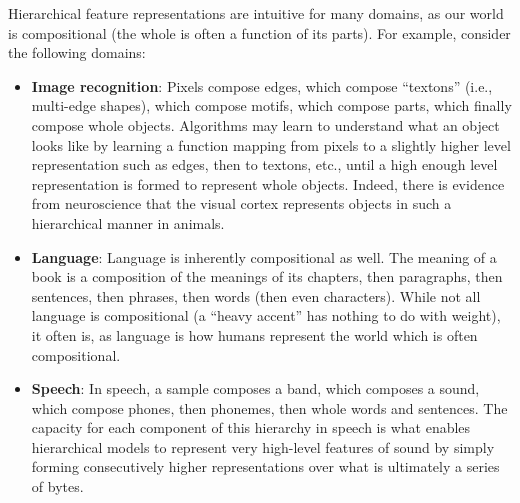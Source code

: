 Hierarchical feature representations are intuitive for many domains, as our world is compositional (the whole is often a function of its parts).
For example, consider the following domains:
\begin{itemize}
    \item \textbf{Image recognition}: Pixels compose edges, which compose ``textons'' (i.e., multi-edge shapes), which compose motifs, which compose parts, which finally compose whole objects.
    Algorithms may learn to understand what an object looks like by learning a function mapping from pixels to a slightly higher level representation such as edges, then to textons, etc., until a high enough level representation is formed to represent whole objects.
    Indeed, there is evidence from neuroscience that the visual cortex represents objects in such a hierarchical manner in animals.

    \item \textbf{Language}: Language is inherently compositional as well.
    The meaning of a book is a composition of the meanings of its chapters, then paragraphs, then sentences, then phrases, then words (then even characters).
    While not all language is compositional (a ``heavy accent'' has nothing to do with weight), it often is, as language is how humans represent the world which is often compositional.

    \item \textbf{Speech}: In speech, a sample composes a band, which composes a sound, which compose phones, then phonemes, then whole words and sentences.
    The capacity for each component of this hierarchy in speech is what enables hierarchical models to represent very high-level features of sound by simply forming consecutively higher representations over what is ultimately a series of bytes.
\end{itemize}
